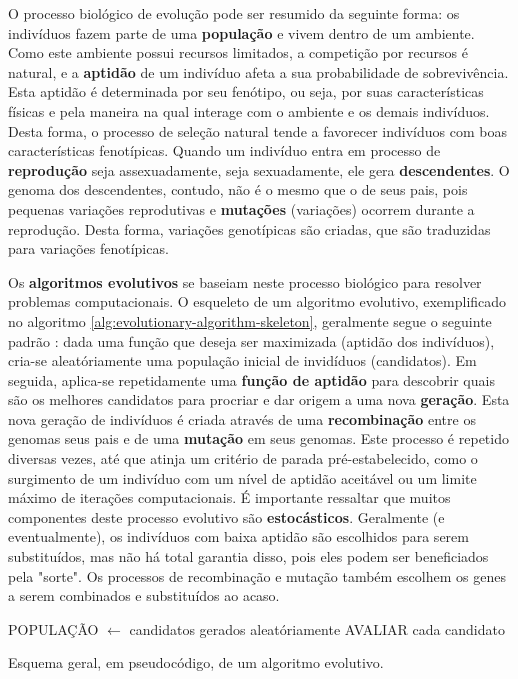 O processo biológico de evolução pode ser resumido da seguinte forma: os
indivíduos fazem parte de uma \textbf{população} e vivem dentro de um ambiente.
Como este ambiente possui recursos limitados, a competição por recursos é
natural, e a \textbf{aptidão} de um indivíduo afeta a sua probabilidade de
sobrevivência. Esta aptidão é determinada por seu fenótipo, ou seja, por suas
características físicas e pela maneira na qual interage com o ambiente e os
demais indivíduos. Desta forma, o processo de seleção natural tende a favorecer
indivíduos com boas características fenotípicas.  Quando um indivíduo entra em
processo de \textbf{reprodução} seja assexuadamente, seja sexuadamente, ele gera
\textbf{descendentes}. O genoma dos descendentes, contudo, não é o mesmo que o
de seus pais, pois pequenas variações reprodutivas e \textbf{mutações}
(variações) ocorrem durante a reprodução. Desta forma, variações genotípicas são
criadas, que são traduzidas para variações fenotípicas. 

Os \textbf{algoritmos evolutivos} se baseiam neste processo biológico para
resolver problemas computacionais. O esqueleto de um algoritmo evolutivo,
exemplificado no algoritmo \ref{alg:evolutionary-algorithm-skeleton}, geralmente
segue o seguinte padrão \cite[Cap. 3]{IntroEvolComputing}: dada uma função que
deseja ser maximizada (aptidão dos indivíduos), cria-se aleatóriamente uma
população inicial de invidíduos (candidatos). Em seguida, aplica-se
repetidamente uma \textbf{função de aptidão} para descobrir quais são os
melhores candidatos para procriar e dar origem a uma nova \textbf{geração}. Esta
nova geração de indivíduos é criada através de uma \textbf{recombinação} entre
os genomas seus pais e de uma \textbf{mutação} em seus genomas.  Este processo é
repetido diversas vezes, até que atinja um critério de parada pré-estabelecido,
como o surgimento de um indivíduo com um nível de aptidão aceitável ou um limite
máximo de iterações computacionais. É importante ressaltar que muitos
componentes deste processo evolutivo são \textbf{estocásticos}.  Geralmente (e
eventualmente), os indivíduos com baixa aptidão são escolhidos para serem
substituídos, mas não há total garantia disso, pois eles podem ser beneficiados
pela "sorte". Os processos de recombinação e mutação também escolhem os genes a
serem combinados e substituídos ao acaso.

\begin{algorithm}[h]
\begin{center}
	\begin{algorithmic}[1]
        \STATE POPULAÇÃO $\gets$ candidatos gerados aleatóriamente
		\STATE AVALIAR cada candidato
		\REPEAT
    \end{algorithmic}
\end{center}
\caption[Esquema geral, em pseudocódigo, de um algoritmo evolutivo.]
{\label{alg:evolutionary-algorithm-skeleton} Esquema geral, em pseudocódigo, de
um algoritmo evolutivo.}
\end{algorithm}

